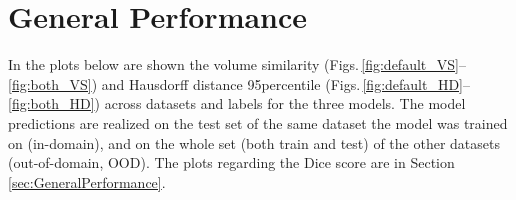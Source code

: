\renewcommand\thefigure{A.\arabic{figure}}
\setcounter{figure}{0}
 \label{app:SupplementaryPlots}
\vspace{1cm}

\section{General Performance}
In the plots below are shown the volume similarity (Figs.\,\ref{fig:default_VS}--\ref{fig:both_VS}) and Hausdorff distance 95\th percentile (Figs.\,\ref{fig:default_HD}--\ref{fig:both_HD}) across datasets and labels for the three models. The model predictions are realized on the test set of the same dataset the model was trained on (in-domain), and on the whole set (both train and test) of the other datasets (out-of-domain, OOD). The plots regarding the Dice score are in Section \ref{sec:GeneralPerformance}.

